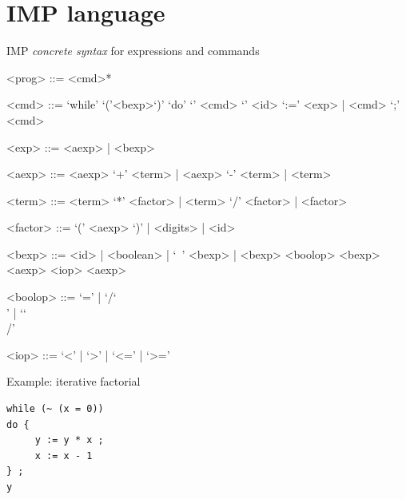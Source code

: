 \documentclass{beamer}
\newcommand{\BS}{\char`\\}
\begin{document}

\section{\textsc{IMP} language}


\begin{frame}[fragile]{\textsc{IMP} \emph{concrete syntax} for expressions and commands}

\begin{grammar}
<prog> ::= <cmd>* 

<cmd> ::= `while' `('<bexp>`)' `do' `{' <cmd> `}'  \alt <id> `:=' <exp> | <cmd> `;' <cmd> 

<exp> ::= <aexp> | <bexp> 

<aexp> ::= <aexp> `+' <term> | <aexp> `-' <term> | <term>

<term> ::= <term> `*' <factor> | <term> `/' <factor> | <factor>

<factor> ::= `(' <aexp> `)'  | <digits> | <id>

<bexp> ::= <id> | <boolean> | `~' <bexp> | <bexp> <boolop> <bexp> 
\alt <aexp> <iop> <aexp>

<boolop> ::= `=' | `/\BS' | `\BS/'

<iop> ::= `<' | `>' | `<=' | `>=' 
\end{grammar}

\end{frame}


\begin{frame}[fragile]{Example: iterative factorial}
\begin{lstlisting}
while (~ (x = 0))
do {
     y := y * x ;
     x := x - 1
} ;
y
\end{lstlisting}
\end{frame}

\end{document}
